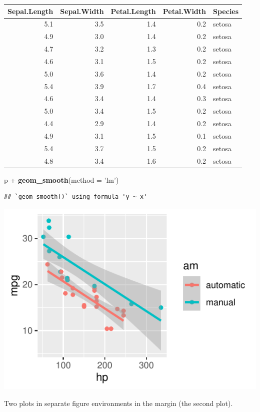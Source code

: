 \documentclass[]{tufte-book}
\newenvironment{Shaded}{}{}
\newcommand{\DataTypeTok}[1]{\textcolor[rgb]{0.56,0.13,0.00}{#1}}
\newcommand{\KeywordTok}[1]{\textcolor[rgb]{0.00,0.44,0.13}{\textbf{#1}}}
\newcommand{\NormalTok}[1]{#1}
\newcommand{\OperatorTok}[1]{\textcolor[rgb]{0.40,0.40,0.40}{#1}}
\newcommand{\StringTok}[1]{\textcolor[rgb]{0.25,0.44,0.63}{#1}}
\begin{document}
\begin{longtable}[]{@{}rrrrl@{}}
\toprule
Sepal.Length & Sepal.Width & Petal.Length & Petal.Width &
Species\tabularnewline
\midrule
\endhead
5.1 & 3.5 & 1.4 & 0.2 & setosa\tabularnewline
4.9 & 3.0 & 1.4 & 0.2 & setosa\tabularnewline
4.7 & 3.2 & 1.3 & 0.2 & setosa\tabularnewline
4.6 & 3.1 & 1.5 & 0.2 & setosa\tabularnewline
5.0 & 3.6 & 1.4 & 0.2 & setosa\tabularnewline
5.4 & 3.9 & 1.7 & 0.4 & setosa\tabularnewline
4.6 & 3.4 & 1.4 & 0.3 & setosa\tabularnewline
5.0 & 3.4 & 1.5 & 0.2 & setosa\tabularnewline
4.4 & 2.9 & 1.4 & 0.2 & setosa\tabularnewline
4.9 & 3.1 & 1.5 & 0.1 & setosa\tabularnewline
5.4 & 3.7 & 1.5 & 0.2 & setosa\tabularnewline
4.8 & 3.4 & 1.6 & 0.2 & setosa\tabularnewline
\bottomrule
\end{longtable}

\begin{Shaded}
\begin{Highlighting}[]
\NormalTok{p }\OperatorTok{+}\StringTok{ }\KeywordTok{geom_smooth}\NormalTok{(}\DataTypeTok{method =} \StringTok{'lm'}\NormalTok{)}
\end{Highlighting}
\end{Shaded}

\begin{verbatim}
## `geom_smooth()` using formula 'y ~ x'
\end{verbatim}

\begin{marginfigure}
\includegraphics{deleteme_files/figure-latex/fig-margin-separate-2} \caption[Two plots in separate figure environments in the margin (the second plot)]{Two plots in separate figure environments in the margin (the second plot).}\label{fig:fig-margin-separate-2}
\end{marginfigure}
\end{document}
